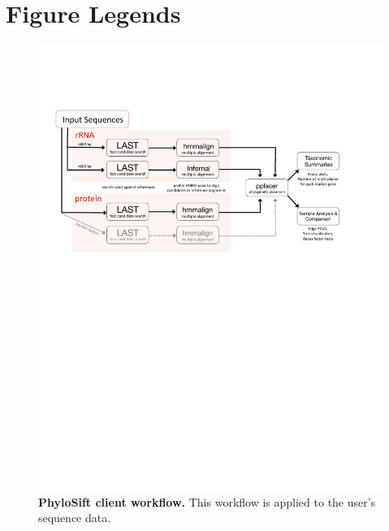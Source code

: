 \documentclass[10pt]{article}
\begin{document}
\section*{Figure Legends}
\begin{figure}[hp]
\begin{center}
\includegraphics[width=6.5in]{figures/Phylosift_overview_oct2012_vector.pdf}
\end{center}
\caption{\textbf{PhyloSift client workflow.} This workflow is applied to the user's sequence data.}
\label{fig:overview}
\end{figure}
\end{document}

